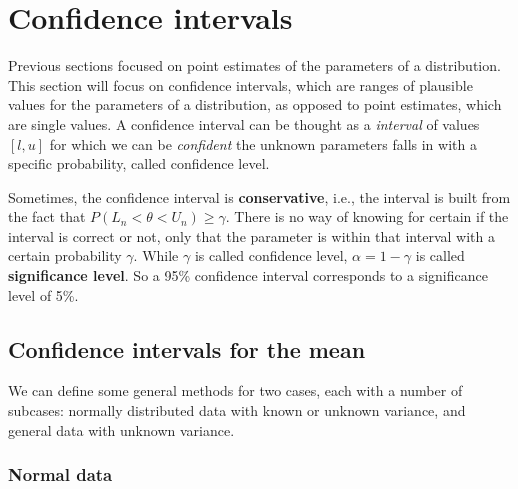 \section{Confidence intervals}

Previous sections focused on point estimates of the parameters of a distribution. This section will focus on confidence intervals, which are ranges of plausible values for the parameters of a distribution, as opposed to point estimates, which are single values. A confidence interval can be thought as a \textit{interval} of values $[l,u]$ for which we can be \textit{confident} the unknown parameters falls in with a specific probability, called confidence level.

Sometimes, the confidence interval is \textbf{conservative}, i.e., the interval is built from the fact that $P(L_n < \theta < U_n) \geq \gamma$. There is no way of knowing for certain if the interval is correct or not, only that the parameter is within that interval with a certain probability $\gamma$. While $\gamma$ is called confidence level, $\alpha = 1 - \gamma$ is called \textbf{significance level}. So a 95\% confidence interval corresponds to a significance level of 5\%.

\subsection{Confidence intervals for the mean}

We can define some general methods for two cases, each with a number of subcases: normally distributed data with known or unknown variance, and general data with unknown variance.

\subsubsection{Normal data}


